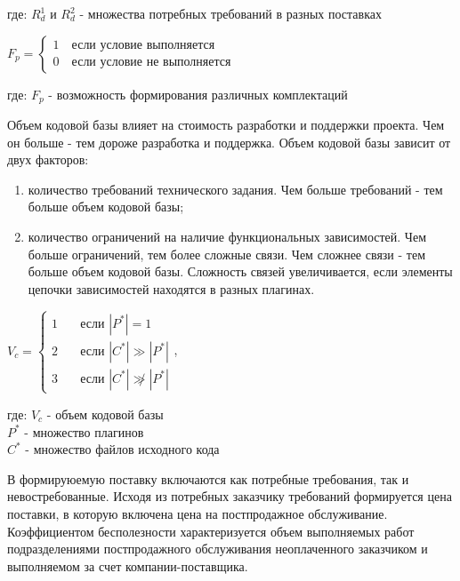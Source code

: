 \documentclass{article}
\begin{document}
\begin{enumerate}
        где: $R^1_{d}$ и $R^2_{d}$ - множества потребных требований в разных поставках

        \begin{center}
            $F_{p} = 
            \begin{cases}
                1 \quad \text{если условие выполняется}\\
                0 \quad \text{если условие не выполняется}
            \end{cases}
            $
        \end{center}

        где: $F_{p}$ - возможность формирования различных комплектаций 

        Объем кодовой базы влияет на стоимость разработки и поддержки проекта. Чем он больше - тем дороже разработка и поддержка. Объем кодовой базы зависит от двух факторов:
        \begin{enumerate}
            \item количество требований технического задания. Чем больше требований - тем больше объем кодовой базы;
            \item количество ограничений на наличие функциональных зависимостей. Чем больше ограничений, тем более сложные связи. Чем сложнее связи - тем больше объем кодовой базы. Сложность связей увеличивается, если элементы цепочки зависимостей находятся в разных плагинах.
        \end{enumerate}

        \begin{center}
            $V_{c} = 
            \begin{cases}
                1 & \quad \text{если } |P^*| = 1\\
                2 & \quad \text{если } |C^*| \gg |P^*|\\
                3 & \quad \text{если } |C^*| \not \gg |P^*|
            \end{cases}
            $,
        \end{center}

        где: $V_{c}$ - объем кодовой базы\\
        $P^*$ - множество плагинов\\
        $C^*$ - множество файлов исходного кода

        В формируюемую поставку включаются как потребные требования, так и невостребованные. Исходя из потребных заказчику требований формируется цена поставки, в которую включена цена на постпродажное обслуживание. Коэффициентом бесполезности характеризуется объем выполняемых работ подразделениями постпродажного обслуживания неоплаченного заказчиком и выполняемом за счет компании-поставщика.


\end{enumerate}
\end{document}
